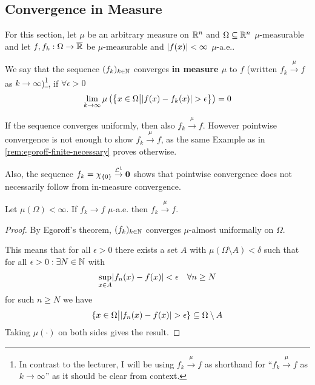 \subsection{Convergence in Measure}
For this section, let 
$\mu$ be an arbitrary measure on $\mathbb{R}^{n}$ and 
$\Omega \subseteq \mathbb{R}^{n}$ $\mu$-measurable and let 
$f,f_k: \Omega \to  \overline{\mathbb{R}}$ be $\mu$-measurable and 
$\vert f(x)\vert < \infty$ $\mu$-a.e..


\begin{dfn}[]
  We say that the sequence $(f_k)_{k \in \mathbb{N}}$ converges \textbf{in measure $\mu$} to $f$ (written $f_k \stackrel{\mu}{\to} f$ as $k \to  \infty$)\footnote{In contrast to the lecturer, I will be using $f_k \stackrel{\mu}{\to} f$ as shorthand for ``$f_k \stackrel{\mu}{\to}f$ as $k \to \infty$'' as it should be clear from context.},
  if $\forall \epsilon > 0$
  \begin{align*}
    \lim_{k \to \infty} \mu\left(
      \left\{x \in \Omega \big\vert \abs{f(x) - f_k(x)} > \epsilon\right\}
    \right)
    = 0
  \end{align*}
\end{dfn}
\begin{rem}[]
If the sequence converges uniformly, then also $f_k \stackrel{\mu}{\to} f$.
However pointwise convergence is not enough to show $f_k \stackrel{\mu}{\to} f$,
as the same Example as in \ref{rem:egoroff-finite-necessary} proves otherwise.

Also, the sequence $f_k = \chi_{\{0\}} \stackrel{\mathcal{L}^{1}}{\to} \bm{0}$ shows that pointwise convergence does not necessarily follow from in-measure convergence.
\end{rem}


\begin{thm}[]
  Let $\mu(\Omega) < \infty$. If $f_k \to f$ $\mu$-a.e. then $f_k \stackrel{\mu}{\to} f$.
\end{thm}
\begin{proof}
  By Egoroff's theorem, $(f_k)_{k \in \mathbb{N}}$ converges $\mu$-almost uniformally on $\Omega$.

  This means that for all $\epsilon > 0$ there exists a set $A$ with $\mu(\Omega \setminus A) < \delta$ such that for all $\epsilon > 0: \exists N \in \N$ with
    \begin{align*}
      \sup_{x \in A} \abs{f_n(x) - f(x)} < \epsilon \quad \forall n \geq N
    \end{align*}
    for such $n \geq N$ we have
    \begin{align*}
      \{x \in \Omega \big\vert \abs{f_n(x) - f(x)} > \epsilon\} \subseteq \Omega \setminus A
    \end{align*}
    Taking $\mu(\cdot)$ on both sides gives the result.
\end{proof}

